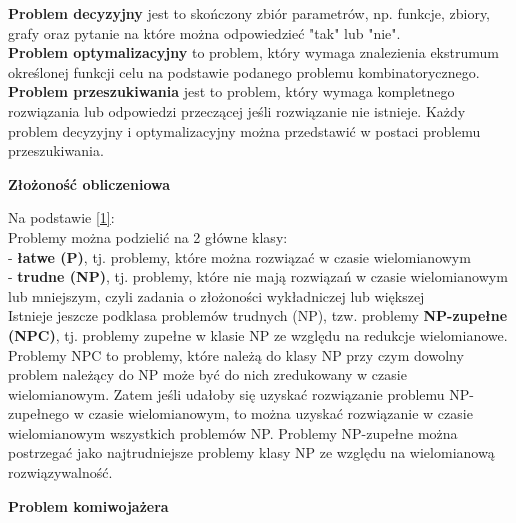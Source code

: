 \documentclass[a4paper, twoside, 12pt, justified]{article}
\begin{document}
	\vspace{5mm}
	\textbf{Problem decyzyjny} jest to skończony zbiór parametrów, np. funkcje, zbiory, grafy oraz pytanie na które można odpowiedzieć "tak" lub "nie".\\
	
	\textbf{Problem optymalizacyjny} to problem, który wymaga znalezienia ekstrumum określonej funkcji celu na podstawie podanego problemu kombinatorycznego. \\
	
	
	\textbf{Problem przeszukiwania} jest to problem, który wymaga kompletnego rozwiązania lub odpowiedzi przeczącej jeśli rozwiązanie nie istnieje. Każdy problem decyzyjny i optymalizacyjny można przedstawić w postaci problemu przeszukiwania. 
	
	
	\begin{large}
		\begin{center}
			\textbf{Złożoność obliczeniowa}
		\end{center}
	\end{large}

	Na podstawie \hyperlink{zlozonosc}{[1]}:\\
	Problemy można podzielić na 2 główne klasy:\\
	- \textbf{łatwe (P)}, tj. problemy, które można rozwiązać w czasie wielomianowym \\
	- \textbf{trudne (NP)}, tj. problemy, które nie mają rozwiązań w czasie wielomianowym lub mniejszym, czyli zadania o złożoności wykładniczej lub większej\\
	
	Istnieje jeszcze podklasa problemów trudnych (NP), tzw. problemy \textbf{NP-zupełne (NPC)}, tj. problemy zupełne w klasie NP ze względu na redukcje wielomianowe. Problemy NPC to problemy, które należą do klasy NP przy czym dowolny problem należący do NP może być do nich zredukowany w czasie wielomianowym. Zatem jeśli udałoby się uzyskać rozwiązanie problemu NP-zupełnego w czasie wielomianowym, to można uzyskać rozwiązanie w czasie wielomianowym wszystkich problemów NP. Problemy NP-zupełne można postrzegać jako najtrudniejsze problemy klasy NP ze względu na wielomianową rozwiązywalność.\newpage
	
	\begin{large}
		\begin{center}
			\textbf{Problem komiwojażera}
		\end{center}
	\end{large}
\end{document}
